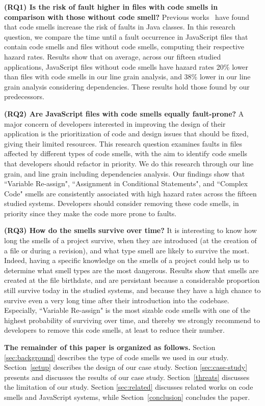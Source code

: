 \textbf{(RQ1) Is the risk of fault higher in files with code smells in comparison with those without code smell?}
Previous works~\cite{Khomh2012,jaafar2013mining} have found that code smells increase the risk of faults in Java classes. In this research question, we compare the time until a fault occurrence in JavaScript files that contain code smells and files without code smells, computing their respective hazard rates. Results show that on average, across our {\color{blue}fifteen} studied applications, JavaScript files without code smells have hazard rates {\color{blue}20\%} lower than files with code smells {\color{blue}in our line grain analysis, and 38\% lower in our line grain analysis considering dependencies. These results hold those found by our predecessors\cite{saboury2017empirical}.}

\textbf{(RQ2) Are JavaScript files with code smells equally fault-prone?}
A major concern of developers interested in improving the design of their application is the prioritization of code and design issues that should be fixed, giving their limited resources. This research question examines faults in files affected by different types of code smells, with the aim to identify code smells that developers should refactor in priority. {\color{blue}We do this research through our line grain, and line grain including dependencies analysis.} Our findings show that ``Variable Re-assign", ``Assignment in Conditional Statements", {\color{blue}and ``Complex Code"} smells are consistently associated with high hazard rates across the {\color{blue}fifteen} studied systems. Developers should consider removing these code smells, in priority since they make the code more prone to faults. 

\textbf{(RQ3) How do the smells survive over time?}
It is interesting to know how long the smells of a project survive, when they are introduced (at the creation of a file or during a revision), and what type smell are likely to survive the most. Indeed, having a specific knowledge on the smells of a project could help us to determine what smell types are the most dangerous. Results show that smells are created at the file birthdate, and are persistant because a considerable proportion still survive today in the studied systems, and because they have a high chance to survive even a very long time after their introduction into the codebase. Especially, ``Variable Re-assign" is the most sizable code smells with one of the highest probability of surviving over time, and thereby we strongly recommend to developers to remove this code smells, at least to reduce their number. 


\textbf{The remainder of this paper is organized as follows.} Section \ref{sec:background} describes the type of code smells we used in our study.
Section~\ref{setup} describes the design of our case study. Section \ref{sec:case-study} presents and discusses the results of our case study. Section~\ref{threats} discusses the limitation of our study. Section \ref{sec:related} discusses related works on code smells and JavaScript systems, while Section~\ref{conclusion} concludes the paper. 